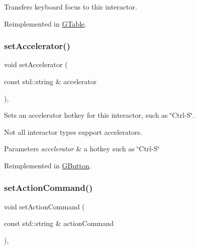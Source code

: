 Transfers keyboard focus to this interactor. 



Reimplemented in \mbox{\hyperlink{classGTable_a5921efd0a5a83eacebdadb749fb3ea7a}{G\+Table}}.

\mbox{\label{classGInteractor_ad15f102f62e2960576012f1aa0ba4b2e}} 
\subsubsection{\texorpdfstring{set\+Accelerator()}{setAccelerator()}}
{\footnotesize\ttfamily void set\+Accelerator (\begin{DoxyParamCaption}\item[{const std\+::string \&}]{accelerator }\end{DoxyParamCaption})\hspace{0.3cm}{\ttfamily [virtual]}, {\ttfamily [inherited]}}



Sets an accelerator hotkey for this interactor, such as \char`\"{}\+Ctrl-\/\+S\char`\"{}. 

Not all interactor types support accelerators. 
\begin{DoxyParams}{Parameters}
{\em accelerator} & a hotkey such as \char`\"{}\+Ctrl-\/\+S\char`\"{} \\
\hline
\end{DoxyParams}


Reimplemented in \mbox{\hyperlink{classGButton_a502f311e78e7531f8a7b50054ce91c85}{G\+Button}}.

\mbox{\label{classGInteractor_a4b5843fe3030e038a1ba54cc03389bcf}} 
\subsubsection{\texorpdfstring{set\+Action\+Command()}{setActionCommand()}}
{\footnotesize\ttfamily void set\+Action\+Command (\begin{DoxyParamCaption}\item[{const std\+::string \&}]{action\+Command }\end{DoxyParamCaption})\hspace{0.3cm}{\ttfamily [virtual]}, {\ttfamily [inherited]}}



